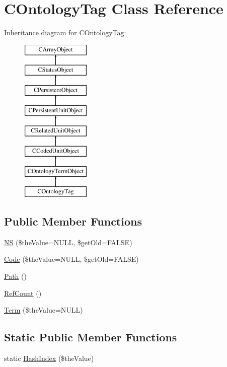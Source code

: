\hypertarget{class_c_ontology_tag}{\section{C\-Ontology\-Tag Class Reference}
\label{class_c_ontology_tag}
}
Inheritance diagram for C\-Ontology\-Tag\-:\begin{figure}[H]
\begin{center}
\leavevmode
\includegraphics[height=8.000000cm]{class_c_ontology_tag}
\end{center}
\end{figure}
\subsection*{Public Member Functions}
\begin{DoxyCompactItemize}
\item 
\hyperlink{class_c_ontology_tag_a23884bcdd17a8d87a54c0a46ec17c921}{N\-S} (\$the\-Value=N\-U\-L\-L, \$get\-Old=F\-A\-L\-S\-E)
\item 
\hyperlink{class_c_ontology_tag_aae5ae36499dc6c4beecce0eee0007e0c}{Code} (\$the\-Value=N\-U\-L\-L, \$get\-Old=F\-A\-L\-S\-E)
\item 
\hyperlink{class_c_ontology_tag_ab375e05b39be9f7edf76b6e7670ea6fb}{Path} ()
\item 
\hyperlink{class_c_ontology_tag_a99190570605cf25d2f15b13d08734ab0}{Ref\-Count} ()
\item 
\hyperlink{class_c_ontology_tag_a2e6731875754a3b6420a1a2c2dfb9778}{Term} (\$the\-Value=N\-U\-L\-L)
\end{DoxyCompactItemize}
\subsection*{Static Public Member Functions}
\begin{DoxyCompactItemize}
\item 
static \hyperlink{class_c_ontology_tag_ab14f0553891595cb3ea1d98016c01078}{Hash\-Index} (\$the\-Value)
\end{DoxyCompactItemize}
